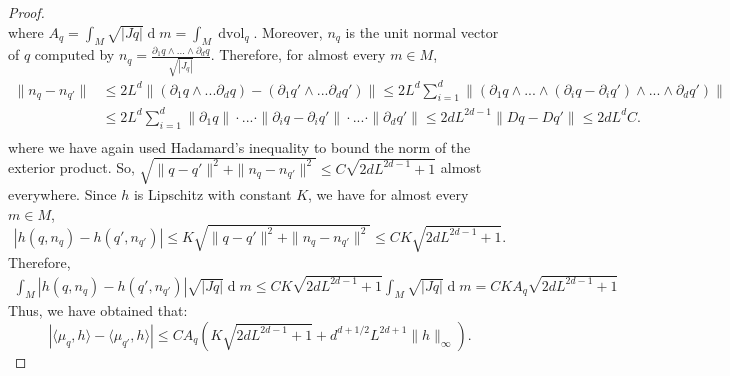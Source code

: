 \documentclass[11pt]{article}
\begin{document}
\begin{proof}
\begin{equation*}
\end{equation*} 
where $A_q=\int_M \sqrt{|Jq|}\operatorname{d}m = \int_M \operatorname{d vol}_q$. Moreover, $n_q$ is the unit normal vector of $q$ computed by $n_q = \frac{\partial_1q\wedge\ldots\wedge\partial_dq}{\sqrt{|J_q|}}$. Therefore, for almost every $m\in M$, 
\begin{align*}
    \|n_q-n_{q'}\|&\leq 2L^d\|(\partial_1q\wedge...\partial_dq)-(\partial_1q'\wedge...\partial_dq')\|\leq2L^d\sum_{i=1}^d\|(\partial_1q\wedge...\wedge(\partial_iq-\partial_iq')\wedge...\wedge\partial_dq')\|\\
    &\leq2L^d\sum_{i=1}^d \|\partial_1q\|\cdot...\cdot\|\partial_iq-\partial_iq'\|\cdot...\cdot\|\partial_dq'\|\leq 2dL^{2d-1} \|Dq-Dq'\|\leq 2dL^dC.\\
\end{align*}
where we have again used Hadamard's inequality to bound the norm of the exterior product. So, $\sqrt{\|q-q'\|^2+\|n_q-n_{q'}\|^2}\leq  C\sqrt{2dL^{2d-1} + 1}$ almost everywhere.
Since $h$ is Lipschitz with constant $K$, we have for almost every $m \in M$,
\begin{equation*}
    |h(q, n_q) - h(q', n_{q'})| \leq K \sqrt{\|q-q'\|^2+\|n_q-n_{q'}\|^2} \leq CK\sqrt{2dL^{2d-1} + 1} .
\end{equation*} 
Therefore,
\begin{align*}
    \int_{M} \left|h(q,n_q)-h(q',n_{q'})\right| \sqrt{|Jq|} \operatorname{d}m \leq CK\sqrt{2dL^{2d-1} + 1}\int_M\sqrt{|Jq|}\operatorname{d}m = CKA_q\sqrt{2dL^{2d-1} + 1}
\end{align*}
Thus, we have obtained that:
\begin{equation*}
    |\langle\mu_q,h\rangle-\langle\mu_{q'},h\rangle|\leq CA_q(K\sqrt{2dL^{2d-1} + 1}+d^{d+1/2}L^{2d+1}\|h\|_{\infty}).
\end{equation*}
\end{proof}
\end{document}
